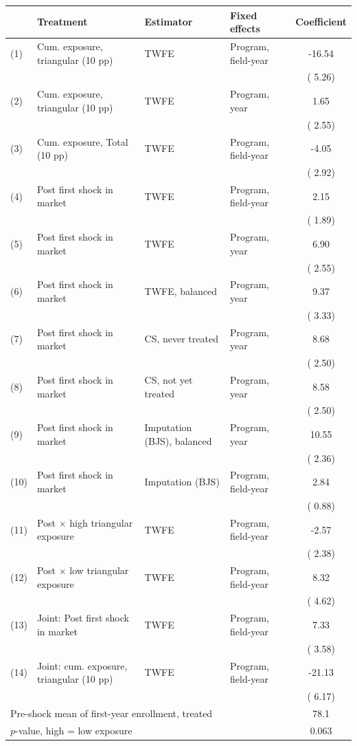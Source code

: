 \begin{tabular}{llllc}
\toprule
 & Treatment & Estimator & Fixed effects & Coefficient \\
\midrule
(1) & Cum. exposure, triangular (10 pp) & TWFE & Program, field-year &  -16.54\sym{***} \\
 & & & & (  5.26) \\
(2) & Cum. exposure, triangular (10 pp) & TWFE & Program, year &    1.65 \\
 & & & & (  2.55) \\
(3) & Cum. exposure, Total (10 pp) & TWFE & Program, field-year &   -4.05 \\
 & & & & (  2.92) \\
(4) & Post first shock in market & TWFE & Program, field-year &    2.15 \\
 & & & & (  1.89) \\
(5) & Post first shock in market & TWFE & Program, year &    6.90\sym{***} \\
 & & & & (  2.55) \\
(6) & Post first shock in market & TWFE, balanced & Program, year &    9.37\sym{***} \\
 & & & & (  3.33) \\
(7) & Post first shock in market & CS, never treated & Program, year &    8.68\sym{***} \\
 & & & & (  2.50) \\
(8) & Post first shock in market & CS, not yet treated & Program, year &    8.58\sym{***} \\
 & & & & (  2.50) \\
(9) & Post first shock in market & Imputation (BJS), balanced & Program, year &   10.55\sym{***} \\
 & & & & (  2.36) \\
(10) & Post first shock in market & Imputation (BJS) & Program, field-year &    2.84\sym{***} \\
 & & & & (  0.88) \\
(11) & Post $\times$ high triangular exposure & TWFE & Program, field-year &   -2.57 \\
 & & & & (  2.38) \\
(12) & Post $\times$ low triangular exposure & TWFE & Program, field-year &    8.32\sym{*} \\
 & & & & (  4.62) \\
(13) & Joint: Post first shock in market & TWFE & Program, field-year &    7.33\sym{**} \\
 & & & & (  3.58) \\
(14) & Joint: cum. exposure, triangular (10 pp) & TWFE & Program, field-year &  -21.13\sym{***} \\
 & & & & (  6.17) \\
\midrule
\multicolumn{4}{l}{Pre-shock mean of first-year enrollment, treated} &   78.1 \\
\multicolumn{4}{l}{\(p\)-value, high = low exposure} & 0.063 \\
\bottomrule
\end{tabular}
